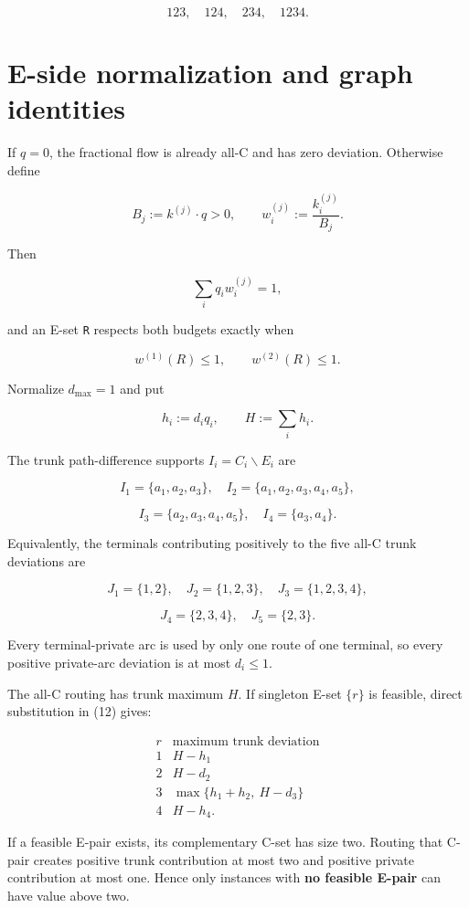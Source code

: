 \documentclass[
  11pt,
]{article}
\begin{document}
\[
123,\quad124,\quad234,\quad1234.
\]

\section{E-side normalization and graph
identities}\label{e-side-normalization-and-graph-identities}

If \(q=0\), the fractional flow is already all-C and has zero deviation.
Otherwise define

\[
B_j:=k^{(j)}\!\cdot q>0,
\qquad
w_i^{(j)}:=\frac{k_i^{(j)}}{B_j}.
\]

Then

\[
\sum_iq_iw_i^{(j)}=1,
\tag{8}
\]

and an E-set \texttt{R} respects both budgets exactly when

\[
w^{(1)}(R)\le1,
\qquad
w^{(2)}(R)\le1.
\tag{9}
\]

Normalize \(d_{\max}=1\) and put

\[
h_i:=d_iq_i,
\qquad
H:=\sum_i h_i.
\tag{10}
\]

The trunk path-difference supports \(I_i=C_i\mathbin{\backslash} E_i\) are

\[
I_1=\{a_1,a_2,a_3\},
\quad
I_2=\{a_1,a_2,a_3,a_4,a_5\},
\]

\[
I_3=\{a_2,a_3,a_4,a_5\},
\quad
I_4=\{a_3,a_4\}.
\tag{11}
\]

Equivalently, the terminals contributing positively to the five all-C
trunk deviations are

\[
J_1=\{1,2\},
\quad
J_2=\{1,2,3\},
\quad
J_3=\{1,2,3,4\},
\]

\[
J_4=\{2,3,4\},
\quad
J_5=\{2,3\}.
\tag{12}
\]

Every terminal-private arc is used by only one route of one terminal, so
every positive private-arc deviation is at most \(d_i\le1\).

The all-C routing has trunk maximum \(H\). If singleton E-set \(\{r\}\)
is feasible, direct substitution in (12) gives:

\[
\begin{array}{c|c}
 r & \text{maximum trunk deviation}\\
\hline
1&H-h_1\\
2&H-d_2\\
3&\max\{h_1+h_2,\ H-d_3\}\\
4&H-h_4.
\end{array}
\tag{13}
\]

If a feasible E-pair exists, its complementary C-set has size two.
Routing that C-pair creates positive trunk contribution at most two and
positive private contribution at most one. Hence only instances with
\textbf{no feasible E-pair} can have value above two.
\end{document}
